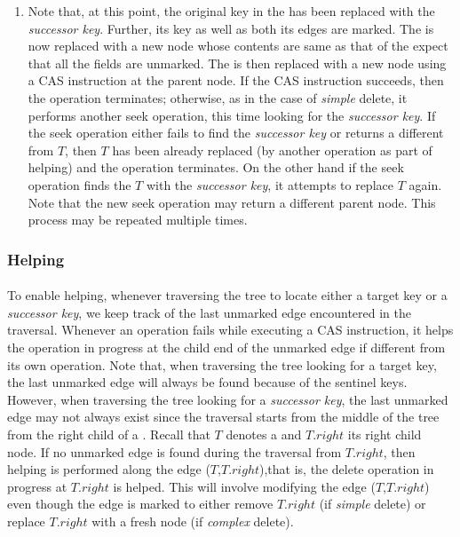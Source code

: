 \begin{enumerate}
\item Note that, at this point, the original key in the \terminalnode \space has been replaced with the \textit{successor key}. Further, its key as well as both its edges are marked. The \terminalnode \space is now replaced with a new node whose contents are same as that of the \terminalnode \space expect that all the fields are unmarked. The \terminalnode \space is then replaced with a new node using a CAS instruction at the parent node. If the CAS instruction succeeds, then the operation terminates; otherwise, as in the case of \textit{simple} delete, it performs another seek operation, this time looking for the \textit{successor key}. If the seek operation either fails to find the \textit{successor key} or returns a \terminalnode \space different from $T$, then $T$ has been already replaced (by another operation as part of helping) and the operation terminates. On the other hand if the seek operation finds the \terminalnode \space $T$ with the \textit{successor key}, it attempts to replace $T$ again. Note that the new seek operation may return a different parent node. This process may be repeated multiple times.
\end{enumerate}


\subsubsection{Helping} \paragraph{}
To enable helping, whenever traversing the tree to locate either a target key or a \textit{successor key}, we keep track of the last unmarked edge encountered in the traversal. Whenever an operation fails while executing a CAS instruction, it helps the operation in progress at the child end of the unmarked edge if different from its own operation. Note that, when traversing the tree looking for a target key, the last unmarked edge will always be found because of the sentinel keys. However, when traversing the tree looking for a \textit{successor key}, the last unmarked edge may not always exist since the traversal starts from the middle of the tree from the right child of a \terminalnode. Recall that $T$ denotes a \terminalnode \space and $T.right$ its right child node. If no unmarked edge is found during the traversal from $T.right$, then helping is performed along the edge ($T$,$T.right$),that is, the delete operation in progress at $T.right$ is helped. This will involve modifying the edge ($T$,$T.right$) even though the edge is marked to either remove $T.right$ (if \textit{simple} delete) or replace $T.right$ with a fresh node (if \textit{complex} delete).
